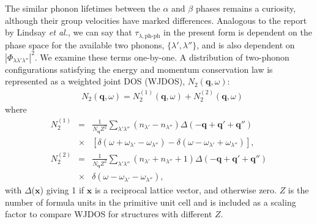 \documentclass[twocolumn,amsmath,amssymb,a4paper,prb,superscriptaddress,floatfix]{revtex4-1}
\begin{document}
The similar phonon lifetimes between the $\alpha$ and
$\beta$ phases remains a curiosity, although their group velocities have marked differences.
Analogous to the report by Lindsay {\it et al.}\cite{Lindsay}, we can say that
$\tau_{\lambda,\text{ph-ph}}$ in the present form is dependent on the phase space for the
available two phonons, $\{\lambda', \lambda''\}$, and is also dependent on
$|\Phi_{\lambda\lambda'\lambda''}|^2$. We examine these terms one-by-one. A
distribution of two-phonon configurations satisfying the energy and momentum
conservation law is represented as a weighted joint DOS
(WJDOS)\cite{phono3py},
${N_2(\mathbf{q},\omega)}$:  
\begin{align}
 \label{eq:jdos}
 &N_2(\mathbf{q},\omega) = N_2^{(1)}(\mathbf{q},\omega) +  N_2^{(2)}(\mathbf{q},\omega)
\end{align}
where 
\begin{eqnarray*}
	N_2^{(1)} & = & \frac{1}{N_\mathbf{q}Z^2} \sum_{\lambda'\lambda''}(n_{\lambda'}-n_{\lambda''})\Delta(-\mathbf{q} + \mathbf{q'} + \mathbf{q''}) \nonumber \\
								   & \times & [\delta(\omega + \omega_{\lambda'} - \omega_{\lambda''}) - \delta(\omega - \omega_{\lambda'} + \omega_{\lambda''})],\\
	N_2^{(2)} & = & \frac{1}{N_\mathbf{q}Z^2} \sum_{\lambda'\lambda''}(n_{\lambda'} + n_{\lambda''}+1)\Delta(-\mathbf{q} + \mathbf{q'} + \mathbf{q''}) \nonumber \\
								   & \times & \delta(\omega - \omega_{\lambda'} - \omega_{\lambda''}),
\end{eqnarray*}
with $\Delta$($\mathbf{x}$) giving 1 if $\mathbf{x}$ is a reciprocal lattice
vector, and otherwise zero. $Z$ is the number of formula units in the primitive unit cell
and is included as a scaling factor to compare WJDOS for structures with different
$Z$. 
\end{document}
